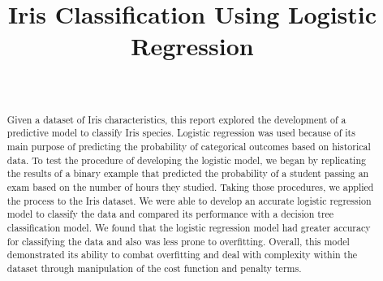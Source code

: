 \documentclass[journal]{IEEEtran}
\begin{document}
\setlength{\emergencystretch}{12pt}
\setlength{\parindent}{10pt}



\lstset{style=mystyle}

\title{Iris Classification Using Logistic Regression}

\author{
\\
}

\maketitle

\begin{abstract}
\label{log:abstract}
Given a dataset of Iris characteristics, this report explored the development of a predictive model to classify Iris species. Logistic regression was used because of its main purpose of predicting the probability of categorical outcomes based on historical data. To test the procedure of developing the logistic model, we began by replicating the results of a binary example that predicted the probability of a student passing an exam based on the number of hours they studied. Taking those procedures, we applied the process to the Iris dataset. We were able to develop an accurate logistic regression model to classify the data and compared its performance with a decision tree classification model. We found that the logistic regression model had greater accuracy for classifying the data and also was less prone to overfitting. Overall, this model demonstrated its ability to combat overfitting and deal with complexity within the dataset through manipulation of the cost function and penalty terms. 
\end{abstract}
\end{document}
